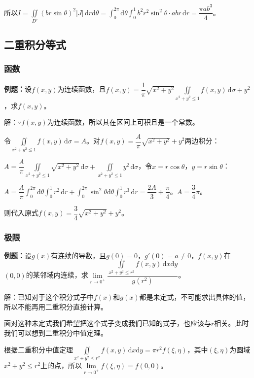\documentclass[UTF8, 12pt]{ctexart}
\begin{document}
所以$I=\iint\limits_{D'}(br\sin\theta)^2\vert J\vert\,\textrm{d}r\textrm{d}\theta=\int_0^{2\pi}\textrm{d}\theta\int_0^1b^2r^2\sin^2\theta\cdot abr\,\textrm{d}r=\dfrac{\pi ab^3}{4}$。

\subsection{二重积分等式}

\subsubsection{函数}

\textbf{例题：}设$f(x,y)$为连续函数，且$f(x,y)=\dfrac{1}{\pi}\sqrt{x^2+y^2}\iint\limits_{x^2+y^2\leqslant1}f(x,y)\,\textrm{d}\sigma+y^2$，求$f(x,y)$。

解：$\because f(x,y)$为连续函数，所以其在区间上可积且是一个常数。

令$\iint\limits_{x^2+y^2\leqslant1}f(x,y)\,\textrm{d}\sigma=A$。对$f(x,y)=\dfrac{A}{\pi}\sqrt{x^2+y^2}+y^2$两边积分：

$A=\dfrac{A}{\pi}\iint\limits_{x^2+y^2\leqslant1}\sqrt{x^2+y^2}\,\textrm{d}\sigma+\iint\limits_{x^2+y^2\leqslant1}y^2\,\textrm{d}\sigma$，令$x=r\cos\theta$，$y=r\sin\theta$：

$A=\dfrac{A}{\pi}\int_0^{2\pi}\textrm{d}\theta\int_0^1r^2\,\textrm{d}r+\int_0^{2\pi}\sin^2\theta\textrm{d}\theta\int_0^1r^3\,\textrm{d}r=\dfrac{2A}{3}+\dfrac{\pi}{4}$。$A=\dfrac{3}{4}\pi$。

则代入原式$f(x,y)=\dfrac{3}{4}\sqrt{x^2+y^2}+y^2$。

\subsubsection{极限}

\textbf{例题：}设$g(x)$有连续的导数，且$g(0)=0$，$g'(0)=a\neq0$，$f(x,y)$在$(0,0)$的某邻域内连续，求$\lim\limits_{r\to0^+}\dfrac{\iint\limits_{x^2+y^2\leqslant r^2}f(x,y)\,\textrm{d}x\textrm{d}y}{g(r^2)}$。

解：已知对于这个积分式子中$f(x)$和$g(x)$都是未定式，不可能求出具体的值，所以不能再用二重积分直接计算。

面对这种未定式我们希望把这个式子变成我们已知的式子，也应该与$r$相关。此时我们可以想到二重积分中值定理。

根据二重积分中值定理$\iint\limits_{x^2+y^2\leqslant r^2}f(x,y)\,\textrm{d}x\textrm{d}y=\pi r^2f(\xi,\eta)$，其中$(\xi,\eta)$为圆域$x^2+y^2\leqslant r^2$上的点，所以$\lim\limits_{r\to0^+}f(\xi,\eta)=f(0,0)$。
\end{document}
